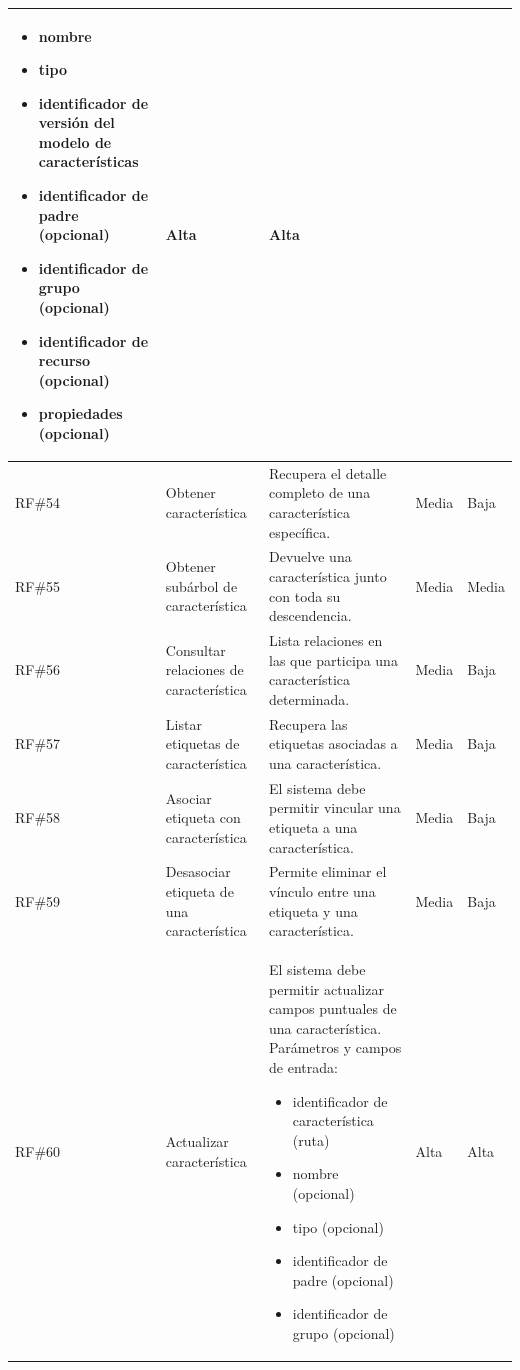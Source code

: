 \begin{longtable}{|p{1cm}|p{4cm}|p{5.2cm}|p{1.9cm}|p{1.9cm}|}
		\begin{itemize}
			\item nombre
			\item tipo
			\item identificador de versión del modelo de características
			\item identificador de padre (opcional)
			\item identificador de grupo (opcional)
			\item identificador de recurso (opcional)
			\item propiedades (opcional)
		\end{itemize}
	& Alta & Alta \\
	\hline
	\ac{RF}\#54 & Obtener característica & Recupera el detalle completo de una característica específica. & Media & Baja \\
	\hline
	\rowcolor[HTML]{EDEBF1}
	\ac{RF}\#55 & Obtener subárbol de característica & Devuelve una característica junto con toda su descendencia. & Media & Media \\
	\hline
	\ac{RF}\#56 & Consultar relaciones de característica & Lista relaciones en las que participa una característica determinada. & Media & Baja \\
	\hline
	\rowcolor[HTML]{EDEBF1}
	\ac{RF}\#57 & Listar etiquetas de característica & Recupera las etiquetas asociadas a una característica. & Media & Baja \\
	\hline
	\ac{RF}\#58 & Asociar etiqueta con característica & El sistema debe permitir vincular una etiqueta a una característica. & Media & Baja \\
	\hline
	\rowcolor[HTML]{EDEBF1}
	\ac{RF}\#59 & Desasociar etiqueta de una característica & Permite eliminar el vínculo entre una etiqueta y una característica. & Media & Baja \\
	\hline
	\ac{RF}\#60	& Actualizar característica & El sistema debe permitir actualizar campos puntuales de una característica. Parámetros y campos de entrada:
		\begin{itemize}
			\item identificador de característica (ruta)
			\item nombre (opcional)
			\item tipo (opcional)
			\item identificador de padre (opcional)
			\item identificador de grupo (opcional)
		\end{itemize}
	& Alta & Alta \\
	\hline

\end{longtable}
